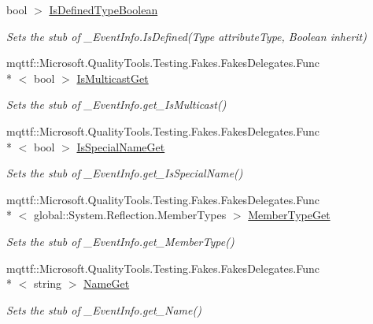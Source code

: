 \begin{DoxyCompactItemize}
bool $>$ \hyperlink{class_system_1_1_runtime_1_1_interop_services_1_1_fakes_1_1_stub___event_info_af2eacd26fbe91552db3f78c4cf419b15}{Is\-Defined\-Type\-Boolean}
\begin{DoxyCompactList}\small\item\em Sets the stub of \-\_\-\-Event\-Info.\-Is\-Defined(\-Type attribute\-Type, Boolean inherit)\end{DoxyCompactList}\item 
mqttf\-::\-Microsoft.\-Quality\-Tools.\-Testing.\-Fakes.\-Fakes\-Delegates.\-Func\\*
$<$ bool $>$ \hyperlink{class_system_1_1_runtime_1_1_interop_services_1_1_fakes_1_1_stub___event_info_a887b97045dee09b9dc0bb400fa90212f}{Is\-Multicast\-Get}
\begin{DoxyCompactList}\small\item\em Sets the stub of \-\_\-\-Event\-Info.\-get\-\_\-\-Is\-Multicast()\end{DoxyCompactList}\item 
mqttf\-::\-Microsoft.\-Quality\-Tools.\-Testing.\-Fakes.\-Fakes\-Delegates.\-Func\\*
$<$ bool $>$ \hyperlink{class_system_1_1_runtime_1_1_interop_services_1_1_fakes_1_1_stub___event_info_a46f7656ffaa65f0748c8529da54fc67e}{Is\-Special\-Name\-Get}
\begin{DoxyCompactList}\small\item\em Sets the stub of \-\_\-\-Event\-Info.\-get\-\_\-\-Is\-Special\-Name()\end{DoxyCompactList}\item 
mqttf\-::\-Microsoft.\-Quality\-Tools.\-Testing.\-Fakes.\-Fakes\-Delegates.\-Func\\*
$<$ global\-::\-System.\-Reflection.\-Member\-Types $>$ \hyperlink{class_system_1_1_runtime_1_1_interop_services_1_1_fakes_1_1_stub___event_info_abfa8ce87977351195aac3a654f6708d6}{Member\-Type\-Get}
\begin{DoxyCompactList}\small\item\em Sets the stub of \-\_\-\-Event\-Info.\-get\-\_\-\-Member\-Type()\end{DoxyCompactList}\item 
mqttf\-::\-Microsoft.\-Quality\-Tools.\-Testing.\-Fakes.\-Fakes\-Delegates.\-Func\\*
$<$ string $>$ \hyperlink{class_system_1_1_runtime_1_1_interop_services_1_1_fakes_1_1_stub___event_info_a241f831bb177197e4a19c5263b6f5f68}{Name\-Get}
\begin{DoxyCompactList}\small\item\em Sets the stub of \-\_\-\-Event\-Info.\-get\-\_\-\-Name()\end{DoxyCompactList}\item 

\end{DoxyCompactItemize}
